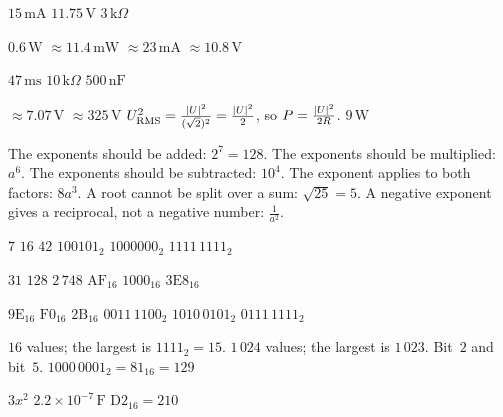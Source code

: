 \begin{facit}
  $15\,\text{mA}$  $11.75\,\text{V}$  $3\,\text{k}\Omega$

  $0.6\,\text{W}$  $\approx 11.4\,\text{mW}$  $\approx
23\,\text{mA}$  $\approx 10.8\,\text{V}$

  $47\,\text{ms}$  $10\,\text{k}\Omega$  $500\,\text{nF}$

  $\approx 7.07\,\text{V}$  $\approx 325\,\text{V}$
 $U_{\text{RMS}}^2 = \frac{\lvert U\rvert^2}{(\sqrt{2})^2} = \frac{\lvert U\rvert^2}{2}$, so
$P = \frac{\lvert U\rvert^2}{2R}$.
 $9\,\text{W}$

  The exponents should be added: $2^7 = 128$.
 The exponents should be multiplied: $a^6$.
 The exponents should be subtracted: $10^4$.
 The exponent applies to both factors: $8a^3$.
 A root cannot be split over a sum: $\sqrt{25} = 5$.
 A negative exponent gives a reciprocal, not a negative number: $\frac{1}{a^2}$.

  $7$  $16$  $42$  $100101_2$  $1000000_2$
 $1111\,1111_2$

  $31$  $128$  $2\,748$  $\mathrm{AF}_{16}$
 $\mathrm{1000}_{16}$  $\mathrm{3E8}_{16}$

  $\mathrm{9E}_{16}$  $\mathrm{F0}_{16}$  $\mathrm{2B}_{16}$
 $0011\,1100_2$  $1010\,0101_2$  $0111\,1111_2$

  $16$ values; the largest is $1111_2 = 15$.  $1\,024$ values; the largest
is $1\,023$.  Bit~$2$ and bit~$5$.  $1000\,0001_2 = \mathrm{81}_{16} = 129$

  $3x^2$  $2.2 \times 10^{-7}\,\text{F}$
 $\mathrm{D2}_{16} = 210$

\end{facit}
